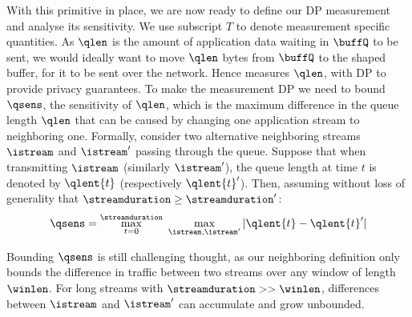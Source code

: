 With this primitive in place, we are now ready to define our DP measurement and
analyse its sensitivity. We use subscript $T$ to denote measurement specific
quantities.
As $\qlen$ is the amount of application data waiting in $\buffQ$ to be sent, we
would ideally want {\sys} to move $\qlen$ bytes from $\buffQ$ to the shaped
buffer, for it to be sent over the network.  Hence {\sys} measures $\qlen$, with
DP to provide privacy guarantees. To make the measurement DP we need to bound
$\qsens$, the sensitivity of $\qlen$, which is the maximum difference in the
queue length $\qlen$ that can be caused  by changing one application stream to
neighboring one.
Formally, consider two alternative neighboring streams $\istream$ and
$\istream'$ passing through the queue.
Suppose that when transmitting $\istream$ (similarly $\istream'$), the
queue length at time $t$ is denoted by $\qlent{t}$ (respectively $\qlent{t}'$).
Then, assuming without loss of generality that $\streamduration \geq
\streamduration'$:
\setlength{\abovedisplayskip}{0pt}
\begin{equation}
    \qsens = \max_{t = 0}^{\streamduration}~\max_{\istream,
        \istream'} | \qlent{t} - \qlent{t}' |
    \label{eqn:ssens}
\end{equation}

Bounding $\qsens$ is still challenging thought, as our neighboring definition
only bounds the difference in traffic between two streams over any window of
length $\winlen$.
For long streams with $\streamduration >> \winlen$, differences between
$\istream$ and $\istream'$ can accumulate and grow unbounded.
\fi

